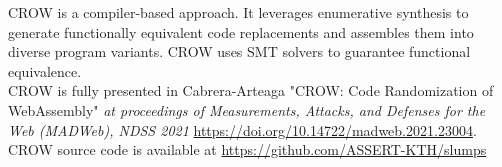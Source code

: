\begin{tcolorbox}[title=Contribution paper and artifact,boxrule=0.5pt,arc=.2em,boxsep=0.5mm]
    CROW is a compiler-based approach.
    It leverages enumerative synthesis to generate functionally equivalent code replacements and assembles them into diverse \wasm program variants. 
    CROW uses SMT solvers to guarantee functional equivalence. \\
    CROW is fully presented in Cabrera-Arteaga \etal "CROW: Code Randomization of WebAssembly"
    \emph{at proceedings of Measurements, Attacks, and Defenses for the Web (MADWeb), NDSS 2021}
    \url{https://doi.org/10.14722/madweb.2021.23004}. 
    \\
    CROW source code is available at \url{https://github.com/ASSERT-KTH/slumps}

\end{tcolorbox}


